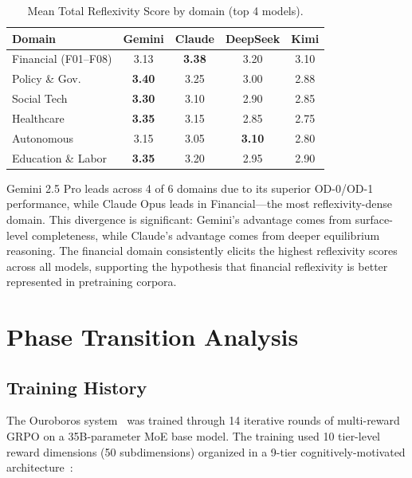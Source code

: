 \documentclass{article}
\begin{document}
\begin{table}[h]
\centering
\caption{Mean Total Reflexivity Score by domain (top 4 models).}
\label{tab:domain-breakdown}
\begin{tabular}{@{}lcccc@{}}
\toprule
\textbf{Domain} & \textbf{Gemini} & \textbf{Claude} & \textbf{DeepSeek} & \textbf{Kimi} \\
\midrule
Financial (F01--F08) & 3.13 & \textbf{3.38} & 3.20 & 3.10 \\
Policy \& Gov. & \textbf{3.40} & 3.25 & 3.00 & 2.88 \\
Social Tech & \textbf{3.30} & 3.10 & 2.90 & 2.85 \\
Healthcare & \textbf{3.35} & 3.15 & 2.85 & 2.75 \\
Autonomous & 3.15 & 3.05 & \textbf{3.10} & 2.80 \\
Education \& Labor & \textbf{3.35} & 3.20 & 2.95 & 2.90 \\
\bottomrule
\end{tabular}
\end{table}

Gemini 2.5 Pro leads across 4 of 6 domains due to its superior OD-0/OD-1 performance, while Claude Opus leads in Financial---the most reflexivity-dense domain. This divergence is significant: Gemini's advantage comes from surface-level completeness, while Claude's advantage comes from deeper equilibrium reasoning. The financial domain consistently elicits the highest reflexivity scores across all models, supporting the hypothesis that financial reflexivity is better represented in pretraining corpora.

\section{Phase Transition Analysis}
\label{sec:phase-transition}

\subsection{Training History}

The Ouroboros system~\citep{zhang2026} was trained through 14 iterative rounds of multi-reward GRPO on a 35B-parameter MoE base model. The training used 10 tier-level reward dimensions (50 subdimensions) organized in a 9-tier cognitively-motivated architecture~\citep{zhang2026}:
\end{document}
